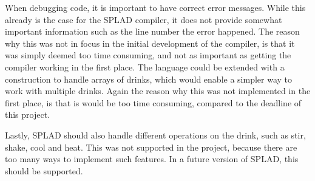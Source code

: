 When debugging code, it is important to have correct error messages. While this already is the case for the SPLAD compiler, it does not provide somewhat important information such as the line number the error happened. The reason why this was not in focus in the initial development of the compiler, is that it was simply deemed too time consuming, and not as important as getting the compiler working in the first place. The language could be extended with a construction to handle arrays of drinks, which would enable a simpler way to work with multiple drinks. Again the reason why this was not implemented in the first place, is that is would be too time consuming, compared to the deadline of this project.

Lastly, SPLAD should also handle different operations on the drink, such as stir, shake, cool and heat. This was not supported in the project, because there are too many ways to implement such features. In a future version of SPLAD, this should be supported.